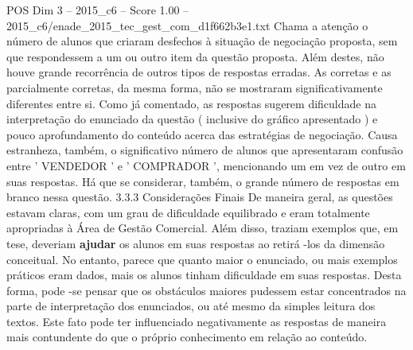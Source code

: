 \begin{textsample}{POS Dim 3 – 2015\_c6 – Score 1.00 – 2015\_c6/enade\_2015\_tec\_gest\_com\_d1f662b3e1.txt}
Chama a atenção o número de alunos que criaram desfechos à situação de negociação proposta, sem que respondessem a um ou outro item da questão proposta.
Além destes, não houve grande recorrência de outros tipos de respostas erradas.
As corretas e as parcialmente corretas, da mesma forma, não se mostraram significativamente diferentes entre si.
Como já comentado, as respostas sugerem dificuldade na interpretação do enunciado da questão ( inclusive do gráfico apresentado ) e pouco aprofundamento do conteúdo acerca das estratégias de negociação.
Causa estranheza, também, o significativo número de alunos que apresentaram confusão entre ' VENDEDOR ' e ' COMPRADOR ', mencionando um em vez de outro em suas respostas.
Há que se considerar, também, o grande número de respostas em branco nessa questão. 3.3.3 Considerações Finais De maneira geral, as questões estavam claras, com um grau de dificuldade equilibrado e eram totalmente apropriadas à Área de Gestão Comercial.
Além disso, traziam exemplos que, em tese, deveriam \textbf{ajudar} os alunos em suas respostas ao retirá -los da dimensão conceitual.
No entanto, parece que quanto maior o enunciado, ou mais exemplos práticos eram dados, mais os alunos tinham dificuldade em suas respostas.
Desta forma, pode -se pensar que os obstáculos maiores pudessem estar concentrados na parte de interpretação dos enunciados, ou até mesmo da simples leitura dos textos.
Este fato pode ter influenciado negativamente as respostas de maneira mais contundente do que o próprio conhecimento em relação ao conteúdo.

\end{textsample}
